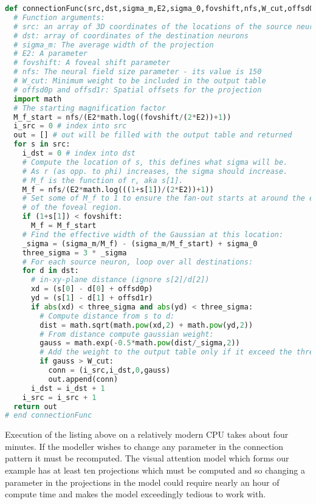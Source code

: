 \documentclass[11pt, a4paper]{article}
\begin{document}
\begin{lstlisting}[language=Python]
def connectionFunc(src,dst,sigma_m,E2,sigma_0,fovshift,nfs,W_cut,offsd0p,offsd1r):
  # Function arguments:
  # src: an array of 3D coordinates of the locations of the source neurons
  # dst: array of coordinates of the destination neurons
  # sigma_m: The average width of the projection
  # E2: A parameter
  # fovshift: A foveal shift parameter
  # nfs: The neural field size parameter - its value is 150
  # W_cut: Minimum weight to be included in the output table
  # offsd0p and offsd1r: Spatial offsets for the projection
  import math
  # The starting magnification factor
  M_f_start = nfs/(E2*math.log((fovshift/(2*E2))+1))
  i_src = 0 # index into src
  out = [] # out will be filled with the output table and returned
  for s in src:
    i_dst = 0 # index into dst
    # Compute the location of s, this defines what sigma will be.
    # As r (as opp. to phi) increases, the sigma should increase.
    # M_f is the function of r, aka s[1].
    M_f = nfs/(E2*math.log(((1+s[1])/(2*E2))+1))
    # Set some of M_f to 1 to ensure the fan-out starts at around the edge
    # of the foveal region.
    if (1+s[1]) < fovshift:
      M_f = M_f_start
    # Find the effective width of the Gaussian at this location:
    _sigma = (sigma_m/M_f) - (sigma_m/M_f_start) + sigma_0
    three_sigma = 3 * _sigma
    # For each source neuron, loop over all destinations:
    for d in dst:
      # in-xy-plane distance (ignore s[2]/d[2])
      xd = (s[0] - d[0] + offsd0p)
      yd = (s[1] - d[1] + offsd1r)
      if abs(xd) < three_sigma and abs(yd) < three_sigma:
        # Compute distance from s to d:
        dist = math.sqrt(math.pow(xd,2) + math.pow(yd,2))
        # From distance compute gaussian weight:
        gauss = math.exp(-0.5*math.pow(dist/_sigma,2))
        # Add the weight to the output table only if it exceed the threshold, W_cut:
        if gauss > W_cut:
          conn = (i_src,i_dst,0,gauss)
          out.append(conn)
      i_dst = i_dst + 1
    i_src = i_src + 1
  return out
# end connectionFunc
\end{lstlisting}

Execution of the listing above on a relatively modern CPU takes about four
minutes. If the modeller wishes to change any parameter in the connection
pattern it must be recomputed. The visual attention model which forms our
example has at least ten projections which must be computed and so changing a
parameter in the projections in the model could require nearly an hour of
compute time and makes the model exceedingly tedious to work with.
\end{document}
